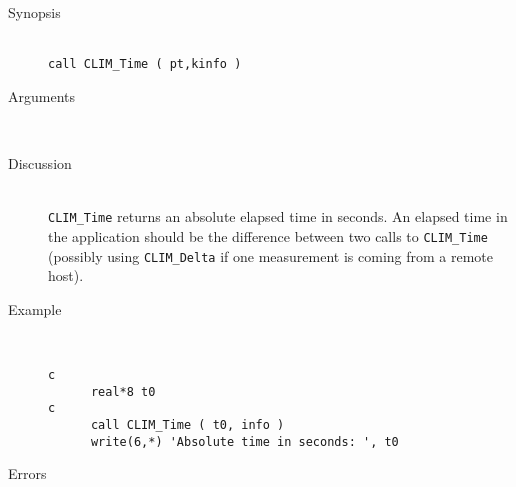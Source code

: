 \begin{description}
  \item[Synopsis]~ \\[10pt]
    {\tt call CLIM\_Time ( pt,kinfo )}
  \item[Arguments]~
  \item[Discussion]~\\[10pt]
    {\tt CLIM\_Time} returns an absolute elapsed time in seconds. An
    elapsed time in the application should be the difference between two
    calls to {\tt CLIM\_Time} (possibly using {\tt CLIM\_Delta} if one
    measurement is coming from a remote host).
  \item[Example]~
    \begin{verbatim}
c
      real*8 t0
c
      call CLIM_Time ( t0, info )
      write(6,*) 'Absolute time in seconds: ', t0
    \end{verbatim}
  \item[Errors]~\\[10pt]
    \begin{tabular}{l l p{10cm} }
    \end{tabular}
\end{description}
%
%

